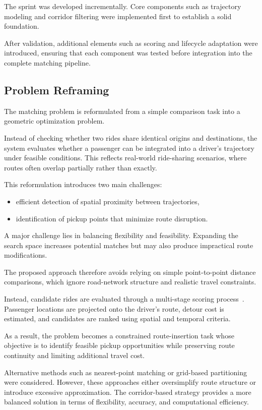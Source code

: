 The sprint was developed incrementally. Core components such as trajectory modeling and corridor filtering were implemented first to establish a solid foundation.

After validation, additional elements such as scoring and lifecycle adaptation were introduced, ensuring that each component was tested before integration into the complete matching pipeline.
\subsection{Problem Reframing}

The matching problem is reformulated from a simple comparison task into a geometric optimization problem.

Instead of checking whether two rides share identical origins and destinations, the system evaluates whether a passenger can be integrated into a driver’s trajectory under feasible conditions. This reflects real-world ride-sharing scenarios, where routes often overlap partially rather than exactly.

This reformulation introduces two main challenges:

\begin{itemize}
    \item efficient detection of spatial proximity between trajectories,
    \item identification of pickup points that minimize route disruption.
\end{itemize}

A major challenge lies in balancing flexibility and feasibility. Expanding the search space increases potential matches but may also produce impractical route modifications.

The proposed approach therefore avoids relying on simple point-to-point distance comparisons, which ignore road-network structure and realistic travel constraints.

Instead, candidate rides are evaluated through a multi-stage scoring process~\cite{routing}. Passenger locations are projected onto the driver’s route, detour cost is estimated, and candidates are ranked using spatial and temporal criteria.

As a result, the problem becomes a constrained route-insertion task whose objective is to identify feasible pickup opportunities while preserving route continuity and limiting additional travel cost.

Alternative methods such as nearest-point matching or grid-based partitioning were considered. However, these approaches either oversimplify route structure or introduce excessive approximation. The corridor-based strategy provides a more balanced solution in terms of flexibility, accuracy, and computational efficiency.
